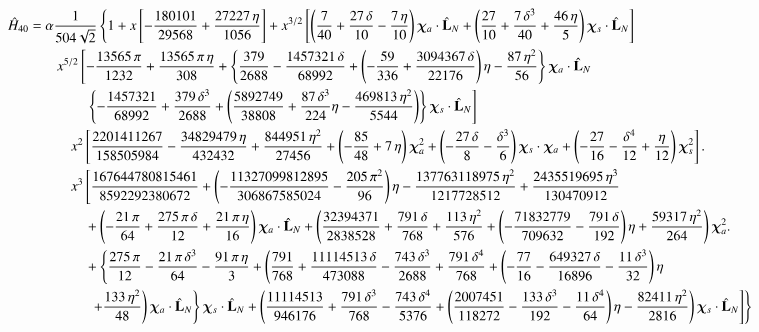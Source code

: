 \documentclass[prd,preprintnumbers,twocolumn,eqsecnum,floatfix,letter]{revtex4}
\begin{document}
\begin{widetext}
\begin{subequations}
\begin{align}\label{eq:H40}
	\hat{H}_{40} &=\alpha\frac{1}{504\sqrt{2}}\left\{1 + x\left[-\frac{180101}{29568} + \frac{27227\,\eta}{1056}\right] + x^{3/2}\left[\left(\frac{7}{40} + \frac{27\,\delta}{10} -\frac{7\,\eta}{10}\right)\bm{\chi}_a \cdot \hat{\mathbf{L}}_N+\left(\frac{27}{10}+\frac{7\,\delta^3}{40} +\frac{46\,\eta}{5}\right)\bm{\chi}_s \cdot \hat{\mathbf{L}}_N\right]\right.\nonumber\\
	&\qquad x^{5/2}\left[-\frac{13565\,\pi}{1232} + \frac{13565\,\pi\,\eta}{308} + \left\{\frac{379}{2688}-\frac{1457321\,\delta}{68992}+\left(-\frac{59}{336} + \frac{3094367\,\delta}{22176}\right)\eta -\frac{87\,\eta^2}{56}\right\}\bm{\chi}_a \cdot \hat{\mathbf{L}}_N\right.\nonumber\\
	&\qquad\qquad \left. \left\{-\frac{1457321}{68992} + \frac{379\,\delta^3}{2688} + \left(\frac{5892749}{38808} + \frac{87\,\delta^3}{224}\eta-\frac{469813\,\eta^2}{5544}\right)\right\}\bm{\chi}_s \cdot \hat{\mathbf{L}}_N\right]\nonumber\\
	&\quad\qquad x^2\left[\frac{2201411267}{158505984} -\frac{34829479\,\eta}{432432} + \frac{844951\,\eta^2}{27456} + \left(-\frac{85}{48} + 7\,\eta\right)\bm{\chi}_a^2 + \left(-\frac{27\, \delta}{8} -\frac{\delta^3}{6}\right)\bm{\chi}_s \cdot \bm{\chi}_a + \left(-\frac{27}{16} -\frac{\delta^4}{12} + \frac{\eta}{12}\right)\bm{\chi}_s^2\right].\nonumber\\
	&\quad\qquad x^3\left[\frac{167644780815461}{8592292380672}+\left(-\frac{11327099812895}{306867585024} -\frac{205\,\pi^2}{96}\right)\eta -\frac{137763118975\,\eta^2}{1217728512} + \frac{2435519695\,\eta^3}{130470912}\right.\nonumber\\
	&\qquad\qquad  + \left(-\frac{21\,\pi}{64} + \frac{275\,\pi\,\delta}{12} + \frac{21\,\pi\,\eta}{16}\right)\bm{\chi}_a \cdot \hat{\mathbf{L}}_N + \left(\frac{32394371}{2838528} + \frac{791\,\delta}{768} + \frac{113\,\eta^2}{576} + \left(-\frac{71832779}{709632} -\frac{791\,\delta}{192}\right)\eta + \frac{59317\,\eta^2}{264}\right)\bm{\chi}_a^2 .\nonumber\\
	&\qquad\qquad + \left\{\frac{275\,\pi}{12} - \frac{21\,\pi\,\delta^3}{64} -\frac{91\,\pi\,\eta}{3} + \left(\frac{791}{768} + \frac{11114513\,\delta}{473088} -\frac{743\,\delta^3}{2688} + \frac{791\,\delta^4}{768} + \left(-\frac{77}{16} -\frac{649327\,\delta}{16896} -\frac{11\,\delta^3}{32}\right)\eta  \right.\right.\nonumber\\
	&\qquad\qquad \left.\left.\left. \left.+ \frac{133\,\eta^2}{48}\right)\bm{\chi}_a \cdot \hat{\mathbf{L}}_N\right\}\bm{\chi}_s \cdot \hat{\mathbf{L}}_N + \left(\frac{11114513}{946176} + \frac{791\,\delta^3}{768} -\frac{743\,\delta^4}{5376} + \left(\frac{2007451}{118272} -\frac{133\,\delta^3}{192} -\frac{11\,\delta^4}{64}\right)\eta - \frac{82411\,\eta^2}{2816}\right)\bm{\chi}_s \cdot \hat{\mathbf{L}}_N\right]\nonumber
	\right\}\\
\end{align}	


\end{subequations}
\end{widetext}
\end{document}
